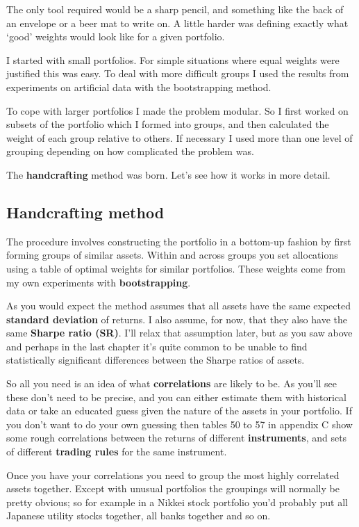 The only tool required would be a sharp pencil, and something like the back of an envelope or a beer mat to write on. A little harder was defining exactly what ‘good' weights would look like for a given portfolio.

I started with small portfolios. For simple situations where equal weights were justified this was easy. To deal with more difficult groups I used the results from experiments on artificial data with the bootstrapping method.

To cope with larger portfolios I made the problem modular. So I first worked on subsets of the portfolio which I formed into groups, and then calculated the weight of each group relative to others. If necessary I used more than one level of grouping depending on how complicated the problem was.

The \textbf{handcrafting} method was born. Let's see how it works in more detail.

\subsection*{Handcrafting method}

The procedure involves constructing the portfolio in a bottom-up fashion by first forming groups of similar assets. Within and across groups you set allocations using a table of optimal weights for similar portfolios. These weights come from my own experiments with \textbf{bootstrapping}.

As you would expect the method assumes that all assets have the same expected \textbf{standard deviation} of returns. I also assume, for now, that they also have the same \textbf{Sharpe ratio (SR)}. I'll relax that assumption later, but as you saw above and perhaps in the last chapter it's quite common to be unable to find statistically significant differences between the Sharpe ratios of assets.

So all you need is an idea of what \textbf{correlations} are likely to be. As you'll see these don't need to be precise, and you can either estimate them with historical data or take an educated guess given the nature of the assets in your portfolio. If you don't want to do your own guessing then tables 50 to 57 in appendix C show some rough correlations between the returns of different \textbf{instruments}, and sets of different \textbf{trading rules} for the same instrument.

Once you have your correlations you need to group the most highly correlated assets together. Except with unusual portfolios the groupings will normally be pretty obvious; so for example in a Nikkei stock portfolio you'd probably put all Japanese utility stocks together, all banks together and so on.

